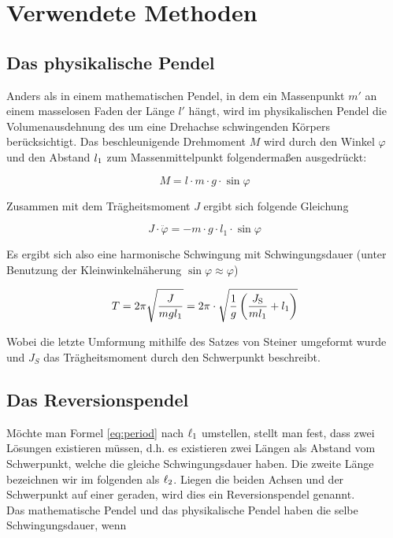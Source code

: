 \section{Verwendete Methoden}
\subsection{Das physikalische Pendel}
Anders als in einem mathematischen Pendel, in dem ein Massenpunkt $m'$ an einem masselosen Faden der Länge $l'$ hängt, wird im physikalischen Pendel die Volumenausdehnung des um eine Drehachse schwingenden Körpers berücksichtigt. Das beschleunigende Drehmoment $M$ wird durch den Winkel $\varphi$ und den Abstand $l_{\mathrm{1}}$ zum Massenmittelpunkt folgendermaßen ausgedrückt:

\begin{equation*}
M = l \cdot m \cdot g \cdot \sin \varphi
\end{equation*}

Zusammen mit dem Trägheitsmoment $J$ ergibt sich folgende Gleichung

\begin{equation}
J \cdot \ddot{\varphi} = - m \cdot g \cdot l_1 \cdot \sin \varphi
\label{eq:basis}
\end{equation}

Es ergibt sich also eine harmonische Schwingung mit Schwingungsdauer (unter Benutzung der Kleinwinkelnäherung $\sin \varphi \approx \varphi$)

\begin{equation}
T = 2\pi \sqrt{\frac{J}{mgl_1}} = 2\pi \cdot  \sqrt{\frac{1}{g}\left(\frac{J_{\mathrm{S}}}{ml_1}+l_1\right)}
\label{eq:period}
\end{equation}

Wobei die letzte Umformung mithilfe des Satzes von Steiner umgeformt wurde und $J_S$ das Trägheitsmoment durch den Schwerpunkt beschreibt.

\subsection{Das Reversionspendel}
Möchte man Formel \ref{eq:period} nach $\ell_1$ umstellen, stellt man fest, dass zwei Lösungen existieren müssen, d.h. es existieren zwei Längen als Abstand vom Schwerpunkt, welche die gleiche Schwingungsdauer haben. Die zweite Länge bezeichnen wir im folgenden als $\ell_2$. Liegen die beiden Achsen und der Schwerpunkt auf einer geraden, wird dies ein Reversionspendel genannt.\\
Das mathematische Pendel und das physikalische Pendel haben die selbe Schwingungsdauer, wenn 

